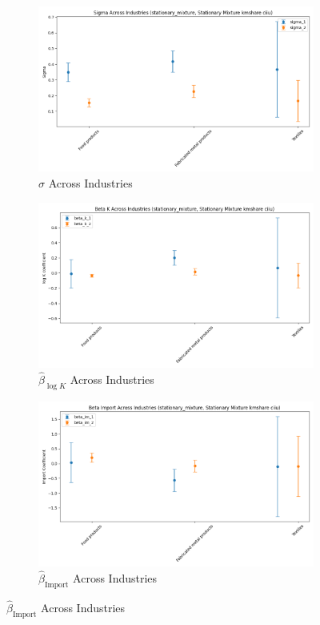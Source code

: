 \documentclass{article}
\begin{document}
\begin{figure}[ht!]
\begin{subfigure}[t]{0.32\textwidth}
        \centering
        \includegraphics[width=\textwidth]{figure/stationary_mixture_kmshare_ciiu_sigma_across_industries.png}
        \caption{$\hat\sigma$ Across Industries}
    \end{subfigure}
    \begin{subfigure}[t]{0.32\textwidth}
        \centering
        \includegraphics[width=\textwidth]{figure/stationary_mixture_kmshare_ciiu_beta_k_across_industries.png}
        \caption{$\hat{\beta}_{\log K}$ Across Industries}
    \end{subfigure}
    \begin{subfigure}[t]{0.32\textwidth}
        \centering
        \includegraphics[width=\textwidth]{figure/stationary_mixture_kmshare_ciiu_beta_im_across_industries.png}
        \caption{$\hat{\beta}_{\text{Import}}$ Across Industries}
    \end{subfigure}
\end{figure}
\end{document}
